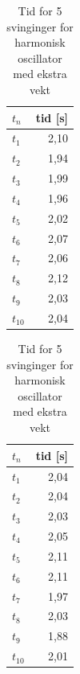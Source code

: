 \documentclass[reprint,norsk,notitlepage]{revtex4-2}
\begin{document}
\begin{table}[!ht]
  \begin{minipage}[t]{.45\linewidth} 
    \centering
        \begin{tabular}[t]{l|r} 
        \toprule
        $t_n$ &tid [s] \\
        \midrule
        $t_1$ &2,10 \\        
        $t_2$ &1,94 \\        
        $t_3$ &1,99 \\        
        $t_4$ &1,96 \\        
        $t_5$ &2,02 \\        
        $t_6$ &2,07 \\        
        $t_7$ &2,06 \\        
        $t_8$ &2,12 \\        
        $t_9$ &2,03   \\        
        $t_{10}$ &2,04 \\
        \bottomrule
        \end{tabular}
    \caption{Tid for 5 svinginger for harmonisk oscillator}
    \label{tab: harmonic oscillator results}
  \end{minipage}
  \begin{minipage}[t]{.45\linewidth} 
    \centering
        \begin{tabular}[t]{l|r} 
        \toprule
        $t_n$ &tid [s] \\
        \midrule
        $t_1$ &2,04 \\        
        $t_2$ &2,04 \\        
        $t_3$ &2,03 \\        
        $t_4$ &2,05 \\        
        $t_5$ &2,11 \\        
        $t_6$ &2,11 \\        
        $t_7$ &1,97 \\        
        $t_8$ &2,03 \\        
        $t_9$ &1,88   \\        
        $t_{10}$ &2,01 \\
        \bottomrule
        \end{tabular}
    \caption{Tid for 5 svinginger for harmonisk oscillator med ekstra vekt}
    \label{tab: harmonic oscillator extra weight results}
  \end{minipage}
\end{table}
\end{document}
